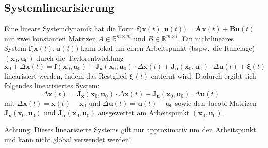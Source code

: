 \documentclass[a4paper, 11pt, accentcolor = tud3b]{tudreport}
\newcommand{\R}{\mathbb{R}}
\newcommand{\mat}[1]{\boldsymbol{#1}}
\renewcommand{\vec}[1]{\boldsymbol{\mathbf{#1}}}
\newcommand{\bspw}{bspw.~}
\begin{document}
			\subsection{Systemlinearisierung}
				Eine lineare Systemdynamik hat die Form \( \vec{f}\big(\vec{x}(t), \vec{u}(t)\big) = \mat{A} \vec{x}(t) + \mat{B} \vec{u}(t) \) mit zwei konstanten Matrizen \( A \in \R^{m \times m} \) und \( B \in \R^{m \times l} \). Ein nichtlineares System \( \vec{f}\big(\vec{x}(t), \vec{u}(t)\big) \) kann lokal um einen Arbeitspunkt (\bspw die Ruhelage) \( (\vec{x}_0, \vec{u}_0) \) durch die Taylorentwicklung
				\begin{equation*}
					\dot{\vec{x}}_0 + \Delta\dot{\vec{x}}(t) = \vec{f}(\vec{x}_0, \vec{u}_0) + \mat{J}_{\vec{x}}(\vec{x}_0, \vec{u}_0) \cdot \Delta\vec{x}(t) + \mat{J}_{\vec{u}}(\vec{x}_0, \vec{u}_0) \cdot \Delta\vec{u}(t) + \vec{\xi}(t)
				\end{equation*}
				linearisiert werden, indem das Restglied \(\vec{\xi}(t)\) entfernt wird. Dadurch ergibt sich folgendes linearisiertes System:
				\begin{equation*}
					\Delta\dot{\vec{x}}(t) = \mat{J}_{\vec{x}}(\vec{x}_0, \vec{u}_0) \cdot \Delta\vec{x}(t) + \mat{J}_{\vec{u}}(\vec{x}_0, \vec{u}_0) \cdot \Delta\vec{u}(t)
				\end{equation*}
				mit \( \Delta\vec{x}(t) = \vec{x}(t) - \vec{x}_0 \) und \( \Delta\vec{u}(t) = \vec{u}(t) - \vec{u}_0 \) sowie den Jacobi-Matrizen \( \mat{J}_{\vec{x}}(\vec{x}_0, \vec{u}_0) \) und \( \mat{J}_{\vec{u}}(\vec{x}_0, \vec{u}_0) \) ausgewertet am Arbeitspunkt \( (\vec{x}_0, \vec{u}_0) \).
				
				Achtung: Dieses linearisierte Systems gilt nur approximativ um den Arbeitspunkt und kann nicht global verwendet werden!
\end{document}
